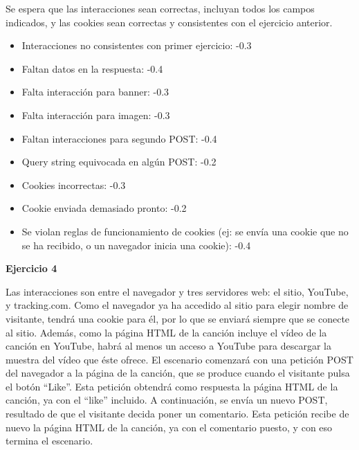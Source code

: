 Se espera que las interacciones sean correctas, incluyan todos los campos indicados, y las cookies sean correctas y consistentes con el ejercicio anterior.

\begin{itemize}
\item Interacciones no consistentes con primer ejercicio: -0.3
\item Faltan datos en la respuesta: -0.4
\item Falta interacción para banner: -0.3
\item Falta interacción para imagen: -0.3
\item Faltan interacciones para segundo POST: -0.4
\item Query string equivocada en algún POST: -0.2
\item Cookies incorrectas: -0.3
\item Cookie enviada demasiado pronto: -0.2
\item Se violan reglas de funcionamiento de cookies (ej: se envía una cookie que no se ha recibido, o un navegador inicia una cookie): -0.4
\end{itemize}

\textbf{Ejercicio 4}

Las interacciones son entre el navegador y tres servidores web: el sitio, YouTube, y tracking.com. Como el navegador ya ha accedido al sitio para elegir nombre de visitante, tendrá una cookie para él, por lo que se enviará siempre que se conecte al sitio. Además, como la página HTML de la canción incluye el vídeo de la canción en YouTube, habrá al menos un acceso a YouTube para descargar la muestra del vídeo que éste ofrece. El escenario comenzará con una petición POST del navegador a la página de la canción, que se produce cuando el visitante pulsa el botón ``Like''. Esta petición obtendrá como respuesta la página HTML de la canción, ya con el ``like'' incluido. A continuación, se envía un nuevo POST, resultado de que el visitante decida poner un comentario. Esta petición recibe de nuevo la página HTML de la canción, ya con el comentario puesto, y con eso termina el escenario.


